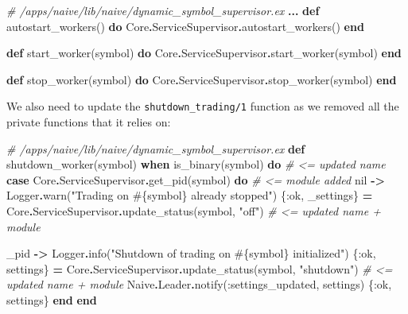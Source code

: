 \documentclass[
  oneside]{book}
\newenvironment{Shaded}{\begin{snugshade}}{\end{snugshade}}
\newcommand{\CommentTok}[1]{\textcolor[rgb]{0.56,0.35,0.01}{\textit{#1}}}
\newcommand{\ConstantTok}[1]{\textcolor[rgb]{0.00,0.00,0.00}{#1}}
\newcommand{\KeywordTok}[1]{\textcolor[rgb]{0.13,0.29,0.53}{\textbf{#1}}}
\newcommand{\NormalTok}[1]{#1}
\newcommand{\OperatorTok}[1]{\textcolor[rgb]{0.81,0.36,0.00}{\textbf{#1}}}
\newcommand{\OtherTok}[1]{\textcolor[rgb]{0.56,0.35,0.01}{#1}}
\newcommand{\StringTok}[1]{\textcolor[rgb]{0.31,0.60,0.02}{#1}}
\newcommand{\VariableTok}[1]{\textcolor[rgb]{0.00,0.00,0.00}{#1}}
\begin{document}
\begin{Shaded}
\begin{Highlighting}[]
  \CommentTok{\# /apps/naive/lib/naive/dynamic\_symbol\_supervisor.ex}
  \OperatorTok{...}
  \KeywordTok{def}\NormalTok{ autostart\_workers() }\KeywordTok{do}
    \ConstantTok{Core}\OperatorTok{.}\ConstantTok{ServiceSupervisor}\OperatorTok{.}\NormalTok{autostart\_workers()}
  \KeywordTok{end}

  \KeywordTok{def}\NormalTok{ start\_worker(symbol) }\KeywordTok{do}
    \ConstantTok{Core}\OperatorTok{.}\ConstantTok{ServiceSupervisor}\OperatorTok{.}\NormalTok{start\_worker(symbol)}
  \KeywordTok{end}

  \KeywordTok{def}\NormalTok{ stop\_worker(symbol) }\KeywordTok{do}
    \ConstantTok{Core}\OperatorTok{.}\ConstantTok{ServiceSupervisor}\OperatorTok{.}\NormalTok{stop\_worker(symbol)}
  \KeywordTok{end}
\end{Highlighting}
\end{Shaded}

We also need to update the \texttt{shutdown\_trading/1} function as we removed all the private functions that it relies on:

\begin{Shaded}
\begin{Highlighting}[]
  \CommentTok{\# /apps/naive/lib/naive/dynamic\_symbol\_supervisor.ex}
  \KeywordTok{def}\NormalTok{ shutdown\_worker(symbol) }\KeywordTok{when}\NormalTok{ is\_binary(symbol) }\KeywordTok{do} \CommentTok{\# \textless{}= updated name}
    \KeywordTok{case} \ConstantTok{Core}\OperatorTok{.}\ConstantTok{ServiceSupervisor}\OperatorTok{.}\NormalTok{get\_pid(symbol) }\KeywordTok{do} \CommentTok{\# \textless{}= module added}
      \ConstantTok{nil} \OperatorTok{{-}\textgreater{}}
        \ConstantTok{Logger}\OperatorTok{.}\NormalTok{warn(}\StringTok{"Trading on }\OtherTok{\#\{}\NormalTok{symbol}\OtherTok{\}}\StringTok{ already stopped"}\NormalTok{)}
\NormalTok{        \{}\VariableTok{:ok}\NormalTok{, \_settings\} }\OperatorTok{=} \ConstantTok{Core}\OperatorTok{.}\ConstantTok{ServiceSupervisor}\OperatorTok{.}\NormalTok{update\_status(symbol, }\StringTok{"off"}\NormalTok{) }\CommentTok{\# \textless{}= updated name + module}

\NormalTok{      \_pid }\OperatorTok{{-}\textgreater{}}
        \ConstantTok{Logger}\OperatorTok{.}\NormalTok{info(}\StringTok{"Shutdown of trading on }\OtherTok{\#\{}\NormalTok{symbol}\OtherTok{\}}\StringTok{ initialized"}\NormalTok{)}
\NormalTok{        \{}\VariableTok{:ok}\NormalTok{, settings\} }\OperatorTok{=} \ConstantTok{Core}\OperatorTok{.}\ConstantTok{ServiceSupervisor}\OperatorTok{.}\NormalTok{update\_status(symbol, }\StringTok{"shutdown"}\NormalTok{) }\CommentTok{\# \textless{}= updated name + module}
        \ConstantTok{Naive}\OperatorTok{.}\ConstantTok{Leader}\OperatorTok{.}\NormalTok{notify(}\VariableTok{:settings\_updated}\NormalTok{, settings)}
\NormalTok{        \{}\VariableTok{:ok}\NormalTok{, settings\}}
    \KeywordTok{end}
  \KeywordTok{end}
\end{Highlighting}
\end{Shaded}
\end{document}
